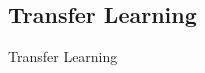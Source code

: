 \subsection{Transfer Learning}
\label{chp:fundamentals:sec:machine_learning:subsec:transfer_learning}
Transfer Learning
